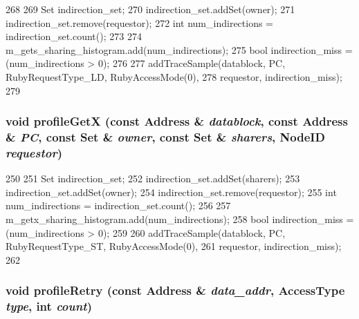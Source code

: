 \begin{DoxyCode}
268 {
269     Set indirection_set;
270     indirection_set.addSet(owner);
271     indirection_set.remove(requestor);
272     int num_indirections = indirection_set.count();
273 
274     m_gets_sharing_histogram.add(num_indirections);
275     bool indirection_miss = (num_indirections > 0);
276 
277     addTraceSample(datablock, PC, RubyRequestType_LD, RubyAccessMode(0),
278                    requestor, indirection_miss);
279 }
\end{DoxyCode}
\hypertarget{classAddressProfiler_ab606b5db14b057fe6c99b4632d2fcd79}{
\subsubsection[{profileGetX}]{\setlength{\rightskip}{0pt plus 5cm}void profileGetX (const {\bf Address} \& {\em datablock}, \/  const {\bf Address} \& {\em PC}, \/  const {\bf Set} \& {\em owner}, \/  const {\bf Set} \& {\em sharers}, \/  {\bf NodeID} {\em requestor})}}
\label{classAddressProfiler_ab606b5db14b057fe6c99b4632d2fcd79}



\begin{DoxyCode}
250 {
251     Set indirection_set;
252     indirection_set.addSet(sharers);
253     indirection_set.addSet(owner);
254     indirection_set.remove(requestor);
255     int num_indirections = indirection_set.count();
256 
257     m_getx_sharing_histogram.add(num_indirections);
258     bool indirection_miss = (num_indirections > 0);
259 
260     addTraceSample(datablock, PC, RubyRequestType_ST, RubyAccessMode(0),
261                    requestor, indirection_miss);
262 }
\end{DoxyCode}
\hypertarget{classAddressProfiler_a1c945549407c104dbbeb48debeb9b19a}{
\subsubsection[{profileRetry}]{\setlength{\rightskip}{0pt plus 5cm}void profileRetry (const {\bf Address} \& {\em data\_\-addr}, \/  AccessType {\em type}, \/  int {\em count})}}
\label{classAddressProfiler_a1c945549407c104dbbeb48debeb9b19a}



